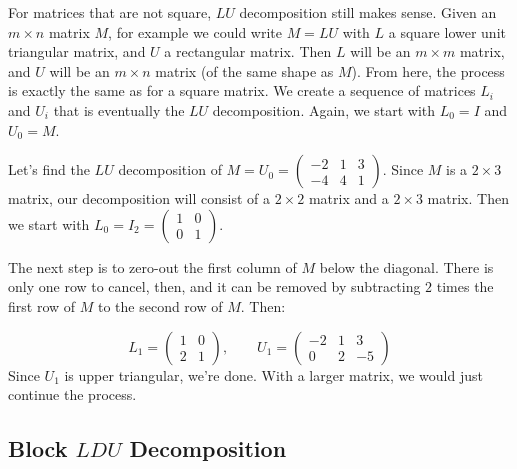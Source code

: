 
For matrices that are not square, $LU$ decomposition still makes sense.  Given an $m\times n$ matrix $M$, for example we could write $M=LU$ with $L$ a square lower unit triangular matrix, and $U$ a rectangular matrix.  Then $L$ will be an $m\times m$ matrix, and $U$ will be an $m\times n$ matrix (of the same shape as $M$).  From here, the process is exactly the same as for a square matrix.  We create a sequence of matrices $L_i$ and $U_i$ that is eventually the $LU$ decomposition.  Again, we start with $L_0=I$ and $U_0=M$.

\begin{example}
Let's find the $LU$ decomposition of $M=U_0=\begin{pmatrix}
-2 & 1 & 3 \\
-4 & 4 & 1 
\end{pmatrix}$.  Since $M$ is a $2\times 3$ matrix, our decomposition will consist of a $2\times 2$ matrix and a $2\times 3$ matrix.  Then we start with $L_0=I_2=\begin{pmatrix}
1 & 0 \\
0 & 1
\end{pmatrix}$.

The next step is to zero-out the first column of $M$ below the diagonal.  There is only one row to cancel, then, and it can be removed by subtracting $2$ times the first row of $M$ to the second row of $M$.  Then:

\[
L_1=\begin{pmatrix}
1 & 0 \\
2 & 1
\end{pmatrix}, \qquad 
U_1 = \begin{pmatrix}
-2 & 1 & 3 \\
0 & 2 & -5 
\end{pmatrix}
\]
Since $U_1$ is upper triangular, we're done.  With a larger matrix, we would just continue the process.
\end{example}





\subsection{Block $LDU$ Decomposition}

